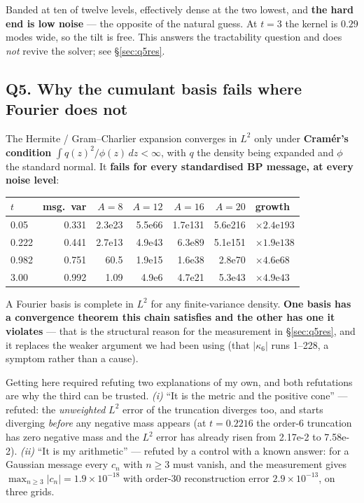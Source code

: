 \documentclass[10pt,a4paper]{article}
\newcommand{\st}[1]{\textbf{#1}}
\begin{document}
\medskip
Banded at ten of twelve levels, effectively dense at the two lowest, and \st{the hard end is
low noise} --- the opposite of the natural guess. At $t=3$ the kernel is $0.29$ modes wide, so
the tilt is free. This answers the tractability question and does \emph{not} revive the solver;
see \S\ref{sec:q5res}.

\subsection{Q5. Why the cumulant basis fails where Fourier does not}

The Hermite / Gram--Charlier expansion converges in $L^2$ only under \st{Cramér's condition}
$\int q(z)^2/\phi(z)\,dz<\infty$, with $q$ the density being expanded and $\phi$ the standard
normal. It \st{fails for every standardised BP message, at every noise level}:

\medskip
\noindent\begin{tabular}{@{}l r rrrr l@{}}
\toprule
$t$ & msg.\ var & $A=8$ & $A=12$ & $A=16$ & $A=20$ & growth \\
\midrule
0.05 & 0.331 & 2.3e23 & 5.5e66 & 1.7e131 & 5.6e216 & $\times2.4\mathrm{e}193$ \\
0.222 & 0.441 & 2.7e13 & 4.9e43 & 6.3e89 & 5.1e151 & $\times1.9\mathrm{e}138$ \\
0.982 & 0.751 & 60.5 & 1.9e15 & 1.6e38 & 2.8e70 & $\times4.6\mathrm{e}68$ \\
3.00 & 0.992 & 1.09 & 4.9e6 & 4.7e21 & 5.3e43 & $\times4.9\mathrm{e}43$ \\
\bottomrule
\end{tabular}

\medskip
A Fourier basis is complete in $L^2$ for any finite-variance density. \st{One basis has a
convergence theorem this chain satisfies and the other has one it violates} --- that is the
structural reason for the measurement in \S\ref{sec:q5res}, and it replaces the weaker argument
we had been using (that $|\kappa_6|$ runs 1--228, a symptom rather than a cause).

Getting here required refuting two explanations of my own, and both refutations are why the
third can be trusted. \emph{(i)} ``It is the metric and the positive cone'' --- refuted: the
\emph{unweighted} $L^2$ error of the truncation diverges too, and starts diverging \emph{before}
any negative mass appears (at $t=0.2216$ the order-6 truncation has zero negative mass and the
$L^2$ error has already risen from 2.17e-2 to 7.58e-2). \emph{(ii)} ``It is my arithmetic''
--- refuted by a control with a known answer: for a Gaussian message every $c_n$ with $n\ge3$
must vanish, and the measurement gives $\max_{n\ge3}|c_n| = 1.9\times10^{-18}$ with order-30
reconstruction error $2.9\times10^{-13}$, on three grids.
\end{document}
